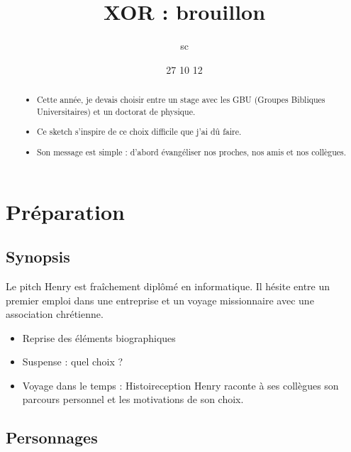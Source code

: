 \documentclass{article}
\title{XOR : brouillon}
\author{sc}
\date{27 10 12}
\begin{document}
\maketitle
    
    \begin{abstract}
        \begin{itemize}
        \item Cette année, je devais choisir entre un stage avec les GBU
        (Groupes Bibliques Universitaires) et un doctorat de physique.
        \item Ce sketch s'inspire de ce choix difficile que j'ai dû faire.
        \item Son message est simple : d'abord évangéliser nos proches,
        nos amis et nos collègues.
        \end{itemize}
    \end{abstract}
    
\section{Préparation}

    \subsection{Synopsis}

        Le pitch
        Henry est fraîchement diplômé en informatique.
        Il hésite entre un premier emploi dans une entreprise
        et un voyage missionnaire avec une association
        chrétienne.
        
        \begin{itemize}
        \item Reprise des éléments biographiques
        \item Suspense : quel choix ?
        \item Voyage dans le temps :
            Histoireception
            Henry raconte à ses collègues son parcours personnel
            et les motivations de son choix.
        \end{itemize}
        
    \subsection{Personnages}
    
\end{document}
